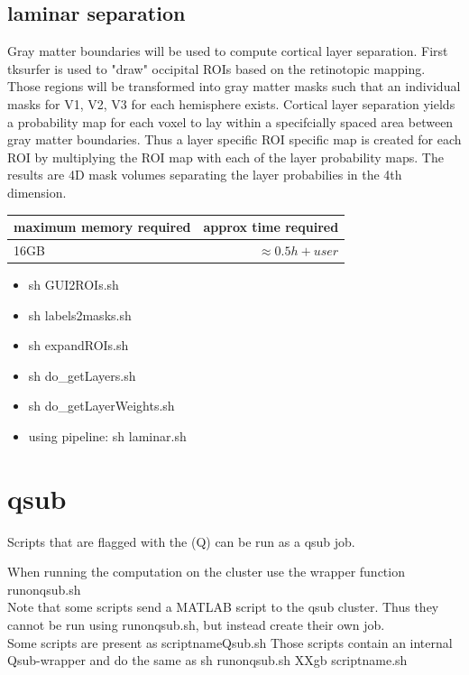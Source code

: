 \documentclass[12pt,a4paper]{scrartcl}
\begin{document}
\subsection{laminar separation}
Gray matter boundaries will be used to compute cortical layer separation. First tksurfer is used to "draw" occipital ROIs based on the retinotopic mapping. Those regions will be transformed into gray matter masks such that an individual masks for V1, V2, V3 for each hemisphere exists. Cortical layer separation yields a probability map for each voxel to lay within a specifcially spaced area between gray matter boundaries. Thus a layer specific ROI specific map is created for each ROI by multiplying the ROI map with each of the layer probability maps. The results are 4D mask volumes separating the layer probabilies in the 4th dimension.
\begin{table}[h]
\begin{tabular}{l | r}
\toprule
maximum memory required & approx time required\\\toprule
16GB & $\approx 0.5h+user$ \\\bottomrule
\end{tabular}
\end{table}
\begin{itemize}
\item sh GUI2ROIs.sh
\item sh labels2masks.sh
\item sh expandROIs.sh
\item sh do\_getLayers.sh
\item sh do\_getLayerWeights.sh
\item using pipeline: sh laminar.sh
\end{itemize}
\section{qsub}
Scripts that are flagged with the (Q) can be run as a qsub job.

\noindent When running the computation on the cluster use the wrapper function runonqsub.sh\\

\noindent Note that some scripts send a MATLAB script to the qsub cluster. Thus they cannot be run using runonqsub.sh, but instead create their own job.\\

\noindent Some scripts are present as scriptnameQsub.sh Those scripts contain an internal Qsub-wrapper and do the same as sh runonqsub.sh XXgb scriptname.sh\\
\end{document}
